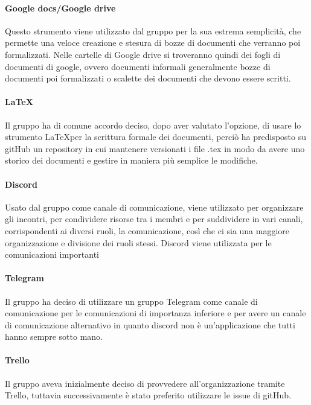 \documentclass[../norme-di-progetto.tex]{subfiles}
\begin{document}
\paragraph{Google docs/Google drive}
Questo strumento viene utilizzato dal gruppo per la sua estrema semplicità, che permette una veloce creazione e stesura di bozze di documenti che verranno poi formalizzati. Nelle cartelle di Google drive si troveranno quindi dei fogli di documenti di google, ovvero documenti informali generalmente bozze di documenti poi formalizzati o scalette dei documenti che devono essere scritti.

\paragraph{\LaTeX}
Il gruppo ha di comune accordo deciso, dopo aver valutato l'opzione, di usare lo strumento \LaTeX per la scrittura formale dei documenti, perciò ha predisposto su gitHub un repository in cui mantenere versionati i file .tex in modo da avere uno storico dei documenti e gestire in maniera più semplice le modifiche.

\paragraph{Discord}
Usato dal gruppo come canale di comunicazione, viene utilizzato per organizzare gli incontri, per condividere risorse tra i membri e per suddividere in vari canali, corrispondenti ai diversi ruoli, la comunicazione, così che ci sia una maggiore organizzazione e divisione dei ruoli stessi. Discord viene utilizzata per le comunicazioni importanti

\paragraph{Telegram}
Il gruppo ha deciso di utilizzare un gruppo Telegram come canale di comunicazione per le comunicazioni di importanza inferiore e per avere un canale di comunicazione alternativo in quanto discord non è un'applicazione che tutti hanno sempre sotto mano.

\paragraph{Trello}
Il gruppo aveva inizialmente deciso di provvedere all'organizzazione tramite Trello, tuttavia successivamente è stato preferito utilizzare le issue di gitHub.
\end{document}
